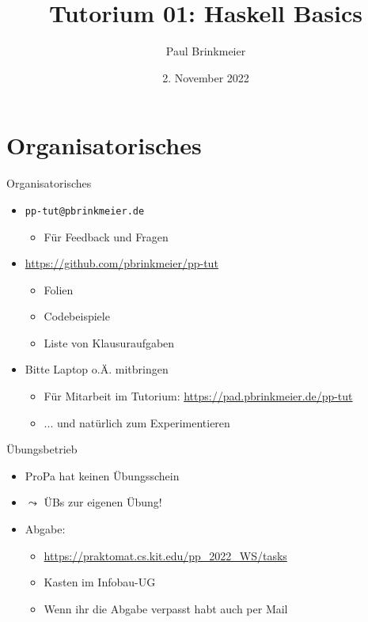 \documentclass{beamer}
\title{Tutorium 01: Haskell Basics}
\author{Paul Brinkmeier}
\institute{Tutorium Programmierparadigmen am KIT}
\date{2. November 2022}
\begin{document}
\begin{frame}
        \titlepage
\end{frame}

\section{Organisatorisches}

\begin{frame}{Organisatorisches}
        \begin{itemize}
                \item \texttt{pp-tut@pbrinkmeier.de}
                \begin{itemize}
                        \item Für Feedback und Fragen
                \end{itemize}
                \item \url{https://github.com/pbrinkmeier/pp-tut}
                \begin{itemize}
                        \item Folien
                        \item Codebeispiele
                        \item Liste von Klausuraufgaben
                \end{itemize}
                \item Bitte Laptop o.Ä. mitbringen
                \begin{itemize}
                    \item Für Mitarbeit im Tutorium: \url{https://pad.pbrinkmeier.de/pp-tut}
                    \item ... und natürlich zum Experimentieren
                \end{itemize}
        \end{itemize}
\end{frame}

\begin{frame}{Übungsbetrieb}
        \begin{itemize}
                \item ProPa hat keinen Übungsschein
                \item $\leadsto$ ÜBs zur eigenen Übung!
                \item Abgabe:
                \begin{itemize}
                  \item \url{https://praktomat.cs.kit.edu/pp_2022_WS/tasks}
                  \item Kasten im Infobau-UG
                  \item Wenn ihr die Abgabe verpasst habt auch per Mail
                \end{itemize}
        \end{itemize}
\end{frame}
\end{document}
